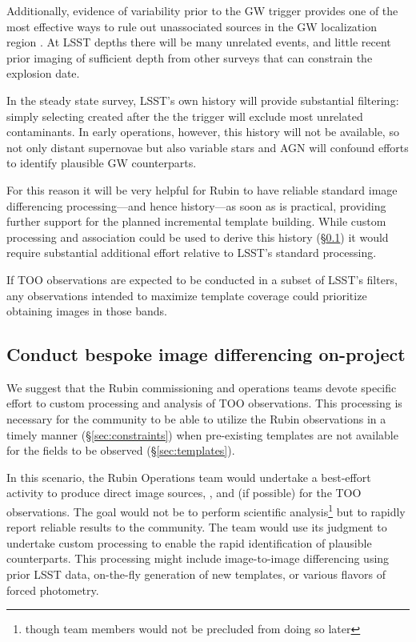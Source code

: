 \documentclass[DM,authoryear,toc]{lsstdoc}
\begin{document}
Additionally, evidence of variability prior to the GW trigger provides one of the most effective ways to rule out unassociated sources in the GW localization region \citep[e.g.,][]{2019GCN.24223....1C, 2019GCN.26430....1S}.
At LSST depths there will be many unrelated events, and little recent prior imaging of sufficient depth from other surveys that can constrain the explosion date.

In the steady state survey, LSST's own history will provide substantial filtering: simply selecting \DIAObjects created after the the trigger will exclude most unrelated contaminants.
In early operations, however, this history will not be available, so not only distant supernovae but also variable stars and AGN will confound efforts to identify plausible GW counterparts.

For this reason it will be very helpful for Rubin to have reliable standard image differencing processing---and hence history---as soon as is practical, providing further support for the planned incremental template building.
While custom processing and association could be used to derive this history (\S \ref{sec:processing}) it would require substantial additional effort relative to LSST's standard processing.

If TOO observations are expected to be conducted in a subset of LSST's filters, any observations intended to maximize template coverage could prioritize obtaining images in those bands.

\subsection{Conduct bespoke image differencing on-project} \label{sec:processing}

We suggest that the Rubin commissioning and operations teams devote specific effort to custom processing and analysis of TOO observations.
This processing is necessary for the community to be able to utilize the Rubin observations in a timely manner (\S \ref{sec:constraints}) when pre-existing templates are not available for the fields to be observed (\S \ref{sec:templates}).

In this scenario, the Rubin Operations team would undertake a best-effort activity to produce direct image sources, \DIASources,  and \DIAObjects (if possible) for the TOO observations.
The goal would not be to perform scientific analysis\footnote{though team members would not be precluded from doing so later} but to rapidly report reliable results to the community.
The team would use its judgment to undertake custom processing to enable the rapid identification of plausible counterparts.
This processing might include image-to-image differencing using prior LSST data, on-the-fly generation of new templates, or various flavors of forced photometry.
\end{document}

